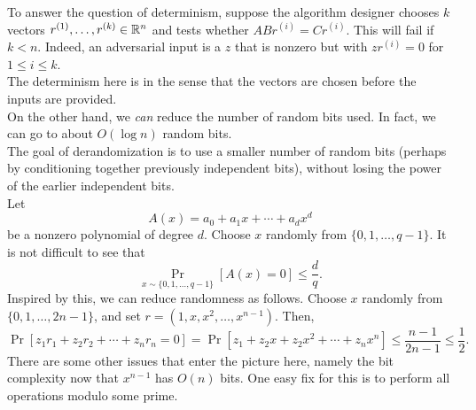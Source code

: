 		To answer the question of determinism, suppose the algorithm designer chooses $k$ vectors $r^{(1)},\ldots,r^{(k)} \in \mathbb{R}^n$ and tests whether $ABr^{(i)} = Cr^{(i)}$. This will fail if $k < n$. Indeed, an adversarial input is a $z$ that is nonzero but with $zr^{(i)} = 0$ for $1 \le i \le k$.\\
		The determinism here is in the sense that the vectors are chosen before the inputs are provided.\\

		On the other hand, we \emph{can} reduce the number of random bits used. In fact, we can go to about $O(\log n)$ random bits.\\
		The goal of derandomization is to use a smaller number of random bits (perhaps by conditioning together previously independent bits), without losing the power of the earlier independent bits.\\
		Let
		\[ A(x) = a_0 + a_1x + \cdots + a_{d}x^{d} \]
		be a nonzero polynomial of degree $d$. Choose $x$ randomly from $\{0,1,\ldots,q-1\}$. It is not difficult to see that
		\[ \Pr_{x \sim \{0,1,\ldots,q-1\}}\left[ A(x) = 0 \right] \le \frac{d}{q}. \]
		Inspired by this, we can reduce randomness as follows. Choose $x$ randomly from $\{0,1,\ldots,2n-1\}$, and set $r = (1,x,x^2,\ldots,x^{n-1})$. Then,
		\[ \Pr[ z_1r_1 + z_2r_2 + \cdots + z_nr_n = 0 ] = \Pr\left[ z_1 + z_2x + z_2x^2 + \cdots + z_nx^n \right] \le \frac{n-1}{2n-1} \le \frac{1}{2}. \]
		There are some other issues that enter the picture here, namely the bit complexity now that $x^{n-1}$ has $O(n)$ bits. One easy fix for this is to perform all operations modulo some prime.


		